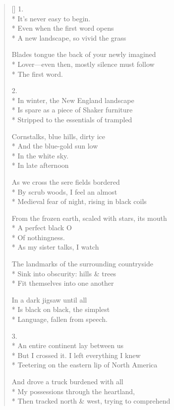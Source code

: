 \label{ch:landscapes}
\settowidth{\versewidth}{The scale, the correspondence between the map's red}
\begin{verse}[\versewidth]
1.\\*
It's never easy to begin.\\*
Even when the first word opens\\*
A new landscape, so vivid the grass

Blades tongue the back of your newly imagined\\*
Lover---even then, mostly silence must follow\\*
The first word.

2.\\*
In winter, the New England landscape\\*
Is spare as a piece of Shaker furniture\\*
Stripped to the essentials of trampled

Cornstalks, blue hills, dirty ice\\*
And the blue-gold sun low\\*
In the white sky.\\*
 \qquad  \qquad In late afternoon

As we cross the sere fields bordered\\*
By scrub woods, I feel an almost\\*
Medieval fear of night, rising in black coils

From the frozen earth, scaled with stars, its mouth\\*
A perfect black O\\*
Of nothingness.\\*
 \qquad  \qquad As my sister talks, I watch

The landmarks of the surrounding countryside\\*
Sink into obscurity: hills \& trees\\*
Fit themselves into one another

In a dark jigsaw until all\\*
Is black on black, the simplest\\*
Language, fallen from speech.

3.\\*
An entire continent lay between us\\*
But I crossed it. I left everything I knew\\*
Teetering on the eastern lip of North America

And drove a truck burdened with all\\*
My possessions through the heartland,\\*
Then tracked north \& west, trying to comprehend


\end{verse}
